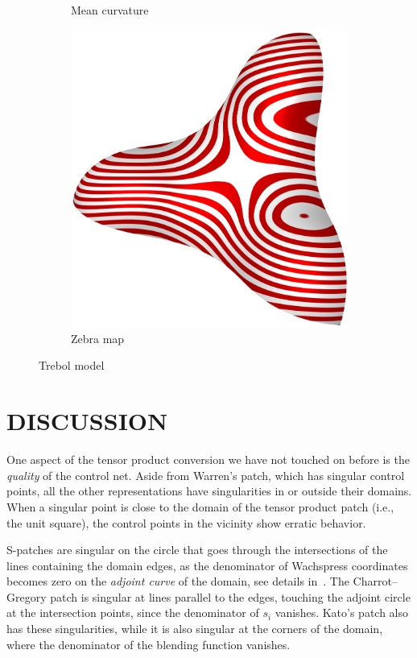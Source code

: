 \documentclass[9pt,academicons]{article}
\begin{document}
\begin{figure}
\begin{subfigure}{.24\textwidth}
    \caption{Mean curvature}
    \label{fig:trebol-mean}
  \end{subfigure}
  \hfill
  \begin{subfigure}{.24\textwidth}
    \centering
    \includegraphics[height=.2\textheight]{images/trebol3-zebra.jpg}
    \caption{Zebra map}
    \label{fig:trebol-zebra}
  \end{subfigure}
  \caption{Trebol model}
  \label{fig:trebol}
\end{figure}

\section{DISCUSSION}
\label{sec:discussion}
One aspect of the tensor product conversion we have not touched on before is the \emph{quality}
of the control net. Aside from Warren's patch, which has singular control points,
all the other representations have singularities in or outside their domains.
When a singular point is close to the domain of the tensor product patch (i.e., the unit square),
the control points in the vicinity show erratic behavior.

S-patches are singular on the circle that goes
through the intersections of the lines containing the domain edges,
as the denominator of Wachspress coordinates becomes zero on the
\emph{adjoint curve} of the domain, see details in~\cite{Floater:2015}.
The Charrot--Gregory patch is singular at lines parallel to the edges,
touching the adjoint circle at the intersection points, since
the denominator of $s_i$ vanishes.
Kato's patch also has these singularities, while it is also singular at the corners of the domain,
where the denominator of the blending function vanishes.
\end{document}
